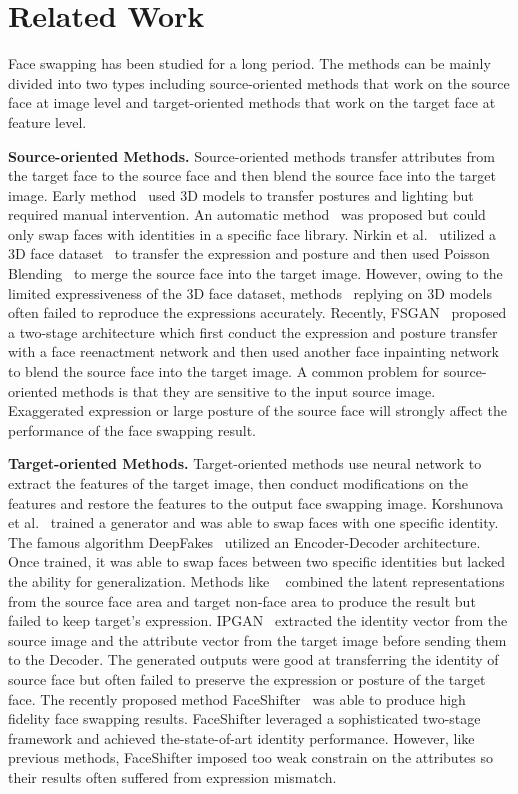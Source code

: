\documentclass[sigconf]{acmart}
\begin{document}
\section{Related Work}

Face swapping has been studied for a long period. The methods can be mainly divided into two types including source-oriented methods that work on the source face at image level and target-oriented methods that work on the target face at feature level.

\noindent\textbf{Source-oriented Methods.} Source-oriented methods transfer attributes from the target face to the source face and then blend the source face into the target image. Early method~\cite{DBLP:Blanz} used 3D models to transfer postures and lighting but required manual intervention. An automatic method~\cite{DBLP:Dimitri} was proposed but could only swap faces with identities in a specific face library. Nirkin et al.~\cite{DBLP:Nirkin} utilized a 3D face dataset~\cite{DBLP:BFM} to transfer the expression and posture and then used Poisson Blending~\cite{DBLP:Poisson} to merge the source face into the target image. However, owing to the limited expressiveness of the 3D face dataset, methods~\cite{DBLP:Blanz,DBLP:Nirkin} replying on 3D models often failed to reproduce the expressions accurately. Recently, FSGAN~\cite{DBLP:FSGAN} proposed a two-stage architecture which first conduct the expression and posture transfer with a face reenactment network and then used another face inpainting network to blend the source face into the target image. A common problem for source-oriented methods is that they are sensitive to the input source image. Exaggerated expression or large posture of the source face will strongly affect the performance of the face swapping result.
 
\noindent\textbf{Target-oriented Methods.} Target-oriented methods use neural network to extract the features of the target image, then conduct modifications on the features and restore the features to the output face swapping image. Korshunova et al.~\cite{DBLP:Korshunova} trained a generator and was able to swap faces with one specific identity. The famous algorithm DeepFakes~\cite{DeepFakes} utilized an Encoder-Decoder architecture. Once trained, it was able to swap faces between two specific identities but lacked the ability for generalization. Methods like ~\cite{DBLP:RSGAN,DBLP:FSNet} combined the latent representations from the source face area and target non-face area to produce the result but failed to keep target's expression. IPGAN~\cite{DBLP:Identity} extracted the identity vector from the source image and the attribute vector from the target image before sending them to the Decoder. The generated outputs were good at transferring the identity of source face but often failed to preserve the expression or posture of the target face. The recently proposed method FaceShifter~\cite{DBLP:FaceShifter} was able to produce high fidelity face swapping results. FaceShifter leveraged a sophisticated two-stage framework and achieved the-state-of-art identity performance. However, like previous methods, FaceShifter imposed too weak constrain on the attributes so their results often suffered from expression mismatch.
\end{document}
